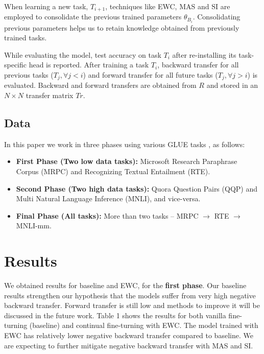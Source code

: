 \documentclass[11pt,a4paper]{article}
\begin{document}
When learning a new task, $T_{i+1}$, techniques like EWC, MAS and SI are employed to consolidate the previous trained parameters $\theta_{B_i}$. Consolidating previous parameters helps us to retain knowledge obtained from previously trained tasks.

While evaluating the model, test accuracy on task $T_i$ after re-installing its task-specific head is reported. After training a task $T_i$, backward transfer for all previous tasks ($T_j, \forall j<i$) and forward transfer for all future tasks ($T_j, \forall j>i$) is evaluated. Backward and forward transfers are obtained from $R$ and stored in an $N \times N$ transfer matrix $Tr$.



\subsection{Data}
\label{sec:data}

In this paper we work in three phases using various GLUE tasks \cite{wang2019glue}, as follows:
\begin{itemize}
  \item \textbf{First Phase (Two low data tasks):} Microsoft Research Paraphrase Corpus (MRPC) and Recognizing Textual Entailment (RTE).
  \item \textbf{Second Phase (Two high data tasks):} Quora Question Pairs (QQP) and Multi Natural Language Inference (MNLI), and vice-versa.
  \item \textbf{Final Phase (All tasks):} More than two tasks -- MRPC $\rightarrow$ RTE $\rightarrow$ MNLI-mm.
\end{itemize}

\section{Results}
\label{sec:results}

We obtained results for baseline and EWC, for the \textbf{first phase}. Our baseline results strengthen our hypothesis that the models suffer from very high negative backward transfer. Forward transfer is still low and methods to improve it will be discussed in the future work.  Table 1 shows the results for both vanilla fine-turning (baseline) and continual fine-turning with EWC.  The model trained with EWC has relatively lower negative backward transfer compared to baseline.  We are expecting to further mitigate negative backward transfer with MAS and SI.  

\end{document}
